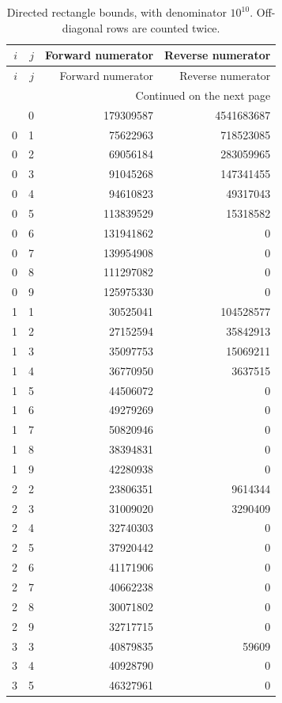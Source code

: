 \documentclass[11pt]{article}
\theoremstyle{remark}
\begin{document}
\begingroup\small
\begin{longtable}{@{}rrrr@{}}
\caption{Directed rectangle bounds, with denominator $10^{10}$.
Off-diagonal rows are counted twice.}
\label{tab:rational-cells}\\
\toprule $i$ & $j$ & Forward numerator & Reverse numerator \\\midrule
\endfirsthead
\toprule $i$ & $j$ & Forward numerator & Reverse numerator \\\midrule
\endhead
\midrule
\multicolumn{4}{r}{\small Continued on the next page}\\
\endfoot
\bottomrule
\endlastfoot
0 & 0 & 179309587 & 4541683687 \\
0 & 1 & 75622963 & 718523085 \\
0 & 2 & 69056184 & 283059965 \\
0 & 3 & 91045268 & 147341455 \\
0 & 4 & 94610823 & 49317043 \\
0 & 5 & 113839529 & 15318582 \\
0 & 6 & 131941862 & 0 \\
0 & 7 & 139954908 & 0 \\
0 & 8 & 111297082 & 0 \\
0 & 9 & 125975330 & 0 \\
1 & 1 & 30525041 & 104528577 \\
1 & 2 & 27152594 & 35842913 \\
1 & 3 & 35097753 & 15069211 \\
1 & 4 & 36770950 & 3637515 \\
1 & 5 & 44506072 & 0 \\
1 & 6 & 49279269 & 0 \\
1 & 7 & 50820946 & 0 \\
1 & 8 & 38394831 & 0 \\
1 & 9 & 42280938 & 0 \\
2 & 2 & 23806351 & 9614344 \\
2 & 3 & 31009020 & 3290409 \\
2 & 4 & 32740303 & 0 \\
2 & 5 & 37920442 & 0 \\
2 & 6 & 41171906 & 0 \\
2 & 7 & 40662238 & 0 \\
2 & 8 & 30071802 & 0 \\
2 & 9 & 32717715 & 0 \\
3 & 3 & 40879835 & 59609 \\
3 & 4 & 40928790 & 0 \\
3 & 5 & 46327961 & 0 \\

\end{longtable}
\end{document}
